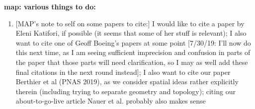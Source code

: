 \documentclass[%
 reprint,
 amsmath,amssymb,
 aps,
]{revtex4-1}
\begin{document}
{\bf map: various things to do:
\begin{enumerate}
\item{[MAP's note to self on some papers to cite:] I would like to cite a paper by Eleni Katifori, if possible (it seems that some of her stuff is relevant); I also want to cite one of Geoff Boeing's papers at some point [7/30/19: I'll now do this next time, as I am seeing sufficient imprecision and confusion in parts of the paper that those parts will need clarification, so I may as well add these final citations in the next round instead]; I also want to cite our paper Berthier et al (PNAS 2019), as we consider spatial ideas rather explicitly therein (including trying to separate geometry and topology); citing our about-to-go-live article Nauer et al. probably also makes sense}
\end{enumerate}
}
\end{document}
